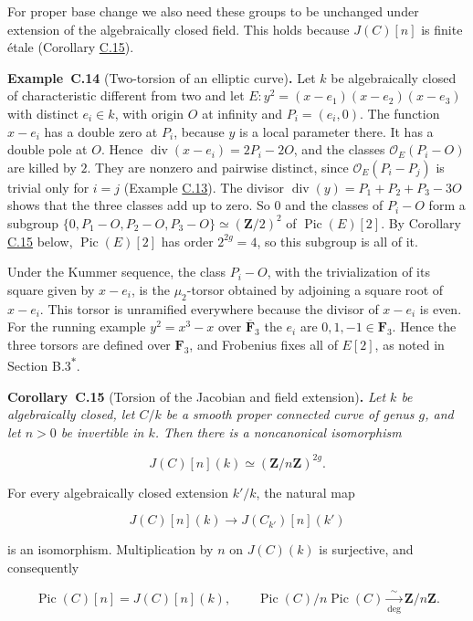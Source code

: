 \documentclass[11pt]{article}
\newenvironment{bpstatement}[2]{\par\addvspace{0.6\baselineskip}\noindent\textbf{#1}#2\textbf{.}\enspace\ignorespaces}
  {\par\addvspace{0.4\baselineskip}}
\newenvironment{bpstatementit}[2]{\begin{bpstatement}{#1}{#2}\itshape\ignorespaces}{\end{bpstatement}}
\newcommand{\bpout}[1]{#1\textsuperscript{\hyperlink{bp-outside}{\ensuremath{\ast}}}}
\begin{document}
For proper base change we also need these groups to be unchanged under extension of the algebraically closed field. This holds because \(J(C)[n]\) is finite étale (Corollary \hyperref[bp45]{C.15}).

\label{bp44}%
\begin{bpstatement}{Example~C.14}{ (Two-torsion of an elliptic curve)}
Let \(k\) be algebraically closed of characteristic different from two and let \(E\colon y^2=(x-e_1)(x-e_2)(x-e_3)\) with distinct \(e_i\in k\), with origin \(O\) at infinity and \(P_i=(e_i,0)\). The function \(x-e_i\) has a double zero at \(P_i\), because \(y\) is a local parameter there. It has a double pole at \(O\). Hence \(\operatorname{div}(x-e_i)=2P_i-2O\), and the classes \(\mathcal O_E(P_i-O)\) are killed by \(2\). They are nonzero and pairwise distinct, since \(\mathcal O_E(P_i-P_j)\) is trivial only for \(i=j\) (Example \hyperref[bp41]{C.13}). The divisor \(\operatorname{div}(y)=P_1+P_2+P_3-3O\) shows that the three classes add up to zero. So \(0\) and the classes of \(P_i-O\) form a subgroup \(\{0,P_1-O,P_2-O,P_3-O\}\simeq(\mathbf Z/2)^2\) of \(\operatorname{Pic}(E)[2]\). By Corollary \hyperref[bp45]{C.15} below, \(\operatorname{Pic}(E)[2]\) has order \(2^{2g}=4\), so this subgroup is all of it.

Under the Kummer sequence, the class \(P_i-O\), with the trivialization of its square given by \(x-e_i\), is the \(\mu_2\)-torsor obtained by adjoining a square root of \(x-e_i\). This torsor is unramified everywhere because the divisor of \(x-e_i\) is even. For the running example \(y^2=x^3-x\) over \(\overline{\mathbf F}_3\) the \(e_i\) are \(0,1,-1\in\mathbf F_3\). Hence the three torsors are defined over \(\mathbf F_3\), and Frobenius fixes all of \(E[2]\), as noted in Section \bpout{B.3}.
\end{bpstatement}

\label{bp45}%
\begin{bpstatementit}{Corollary~C.15}{ (Torsion of the Jacobian and field extension)}
Let \(k\) be algebraically closed, let \(C/k\) be a smooth proper connected curve of genus \(g\), and let \(n>0\) be invertible in \(k\). Then there is a noncanonical isomorphism

\[
J(C)[n](k)\simeq(\mathbf Z/n\mathbf Z)^{2g}.
\]

For every algebraically closed extension \(k'/k\), the natural map

\[
J(C)[n](k)\longrightarrow J(C_{k'})[n](k')
\]

is an isomorphism. Multiplication by \(n\) on \(J(C)(k)\) is surjective, and consequently

\[
\operatorname{Pic}(C)[n]=J(C)[n](k),
\qquad
\operatorname{Pic}(C)/n\operatorname{Pic}(C)
\xrightarrow[\deg]{\ \sim\ }\mathbf Z/n\mathbf Z.
\]
\end{bpstatementit}
\end{document}
